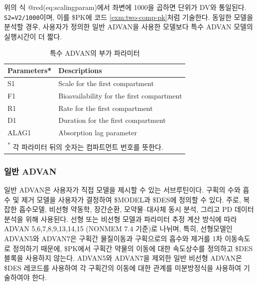 \documentclass[
  11pt,
  krantz2,
  a4paper]{krantz}
\theoremstyle{definition}
\theoremstyle{definition}
\theoremstyle{definition}
\theoremstyle{remark}
\begin{document}
위의 식 @red(eq:scalingparam)에서 좌변에 1000을 곱하면 단위가 DV와 통일된다. \texttt{S2=V2/1000}이며, 이를 \$PK에 코드 \ref{exm:two-comp-pk}처럼 기술한다. 동일한 모델을 분석할 경우, 사용자가 정의한 일반 ADVAN을 사용한 모델보다 특수 ADVAN 모델의 실행시간이 더 짧다.

\begin{table}[!h]

\caption{\label{tab:advan-param}특수 ADVAN의 부가 파라미터}
\centering
\begin{tabular}[t]{ll}
\toprule
Parameters* & Descriptions\\
\midrule
\rowcolor{gray!6}  S1 & Scale for the first compartment\\
F1 & Bioavailability for the first compartment\\
\rowcolor{gray!6}  R1 & Rate for the first compartment\\
D1 & Duration for the first compartment\\
\rowcolor{gray!6}  ALAG1 & Absorption lag parameter\\
\bottomrule
\multicolumn{2}{l}{\textsuperscript{*} 각 파라미터 뒤의 숫자는 컴파트먼트 번호를 뜻한다.}\\
\end{tabular}
\end{table}


\hypertarget{uxc77cuxbc18-advan}{%
\subsubsection{일반 ADVAN}\label{uxc77cuxbc18-advan}}

일반 ADVAN은 사용자가 직접 모델을 제시할 수 있는 서브루틴이다. 구획의 수와 흡수 및 제거 모델을 사용자가 결정하여 \$MODEL과 \$DES에 정의할 수 있다. 주로, 복잡한 흡수모델, 비선형 약동학, 장간순환, 모약물--대사체 동시 분석, 그리고 PD 데이터 분석을 위해 사용된다. 선형 또는 비선형 모델과 파라미터 추정 계산 방식에 따라 ADVAN 5,6,7,8,9,13,14,15 (NONMEM 7.4 기준)로 나뉘며, 특히, 선형모델인 ADVAN5와 ADVAN7은 구획간 물질이동과 구획으로의 흡수와 제거를 1차 이동속도로 정의하기 때문에, \$PK에서 구획간 약물의 이동에 대한 속도상수를 정의하고 \$DES 블록을 사용하지 않는다. ADVAN5와 ADVAN7을 제외한 일반 비선형 ADVAN은 \$DES 레코드를 사용하여 각 구획간의 이동에 대한 관계를 미분방정식을 사용하여 기술하여야 한다.
\end{document}
